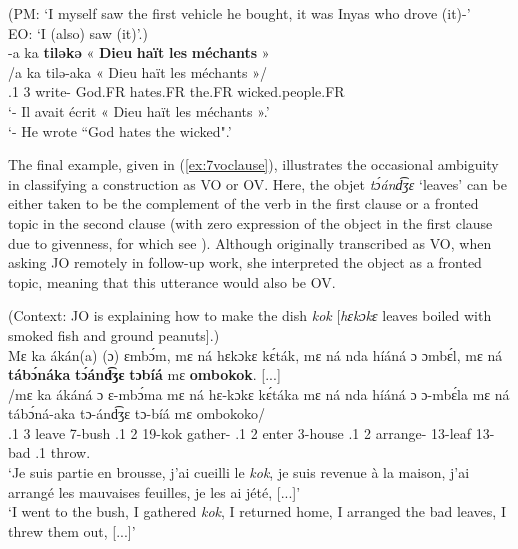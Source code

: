 \documentclass[output=paper,colorlinks,citecolor=brown
]{langscibook}
\begin{document}
\ea
\label{ex:7vofrench}
(PM: `I myself saw the first vehicle he bought, it was Inyas who drove (it)-' \\ EO: `I (also) saw (it)'.) \\
\glll
{\db}-a ka	\textbf{tiləkə}	« \textbf{Dieu}	\textbf{haït}	\textbf{les} {\textbf{méchants} »} \\
/a ka tilə-aka	« Dieu	haït	les {méchants »/} \\
{\db}\SM{}.1 \PST{}3	write-\DUR{} { } God.FR	hates.FR	the.FR wicked.people.FR \\
\glt
`- Il avait écrit « Dieu haït les méchants ».' \\ `- He wrote ``God hates the wicked".' \jambox*{[PM 1047] }

 \z


The final example, given in (\ref{ex:7voclause}), illustrates the occasional ambiguity in classifying a construction as VO or OV. Here, the objet \textit{tɔ́ánd͡ʒɛ} `leaves' can be either taken to be the complement of the verb in the first clause or a fronted topic in the second clause (with zero expression of the object in the first clause due to givenness, for which see ). Although originally transcribed as VO, when asking JO remotely in follow-up work, she interpreted the object as a fronted topic, meaning that this utterance would also be OV. 



\ea
\label{ex:7voclause}
(Context: JO is explaining how to make the dish \textit{kok} [\textit{hɛkɔkɛ} leaves boiled with smoked fish and ground peanuts].) \\
\glll
{\db}Mɛ ka ákán(a) (ɔ) ɛmbɔ́m, mɛ ná hɛkɔkɛ kɛ́ták, mɛ ná nda híáná ɔ ɔmbɛ́l, mɛ ná \textbf{tábɔ́náka} \textbf{tɔ́ánd͡ʒɛ} \textbf{tɔbíá} mɛ \textbf{ombokok}. [...] \\
/mɛ ka ákáná {\db}ɔ ɛ-mbɔ́ma mɛ ná hɛ-kɔkɛ kɛ́táka mɛ ná nda híáná ɔ ɔ-mbɛ́la mɛ ná tábɔ́ná-aka tɔ-ánd͡ʒɛ tɔ-bíá mɛ ombokoko/ \\
{\db}\SM.1\SG{} \PST{}3 leave \PREP{} 7-bush \SM.1\SG{} \PST{}2 19-kok gather-\DUR{} \SM.1\SG{} \PST{}2 \VEN{} enter \PREP{} 3-house \SM.1\SG{} \PST{}2 arrange-\DUR{} 13-leaf 13-bad \SM.1\SG{} throw.\REP{} \\
\glt
`Je suis partie en brousse, j'ai cueilli le \textit{kok}, je suis revenue à la maison, j'ai arrangé les mauvaises feuilles, je les ai jété, [...]' \\ `I went to the bush, I gathered \textit{kok}, I returned home, I arranged the bad leaves, I threw them out, [...]' \jambox*{[JO 1339] }
\end{document}
